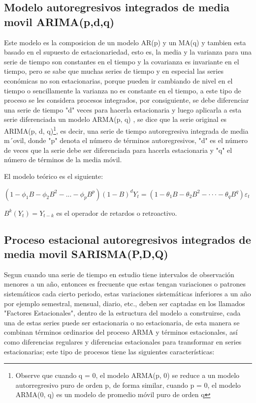 \documentclass[12pt,letterpaper]{report}
\begin{document}
\subsection{Modelo autoregresivos integrados de media movil ARIMA(p,d,q)}

Este modelo es la composicion de un modelo AR(p) y un MA(q) \cite{Cryer} y tambien esta basado en el
supuesto de estacionariedad, esto es, la media y la varianza para una serie de
tiempo son constantes en el tiempo y la covarianza es invariante en el tiempo,
pero se sabe que muchas series de tiempo y en especial las series económicas
no son estacionarias, porque pueden ir cambiando de nivel en el tiempo o
sencillamente la varianza no es constante en el tiempo, a este tipo de proceso
se les considera procesos integrados, por consiguiente, se debe diferenciar
una serie de tiempo "d" veces para hacerla estacionaria y luego aplicarla a esta
serie diferenciada un modelo ARMA(p, q) , se dice que la serie original es
ARIMA(p, d, q)\footnote{Observe que cuando q = 0, el modelo ARMA(p, 0) se reduce a un modelo autorregresivo puro de orden p, de forma similar, cuando p = 0, el modelo ARMA(0, q) es un
modelo de promedio móvil puro de orden q}, es decir, una serie de tiempo autoregresiva integrada de
media m´ovil, donde "p" denota el número de términos autoregresivos, "d" es el
número de veces que la serie debe ser diferenciada para hacerla estacionaria
y "q" el número de términos de la media móvil.

El modelo teórico es el siguiente:

$(1-\phi_1 B - \phi_2 B^2 - ... - \phi_p B^p)(1-B)^d Y_t = (1-  \theta_1 B- \theta_2 B^2-· · ·- \theta_q B^q)\varepsilon_t$

$B^k(Y_t) = Y_{t-k}$ es el operador de retardos o retroactivo.

\subsection{Proceso estacional autoregresivos integrados de media movil SARISMA(P,D,Q)}

Segun \cite{Cryer} cuando una serie de tiempo en estudio tiene intervalos de observación menores a un año, entonces es frecuente que estas tengan variaciones o patrones
sistemáticos cada cierto periodo, estas variaciones sistemáticas inferiores a un
año por ejemplo semestral, mensual, diario, etc., deben ser captadas en los
llamados "Factores Estacionales", dentro de la estructura del modelo a construirse, cada una de estas series puede ser estacionaria o no estacionaria, de
esta manera se combinan términos ordinarios del proceso ARMA y términos
estacionales, así como diferencias regulares y diferencias estacionales para
transformar en series estacionarias; este tipo de procesos
tiene las siguientes características:
\end{document}
